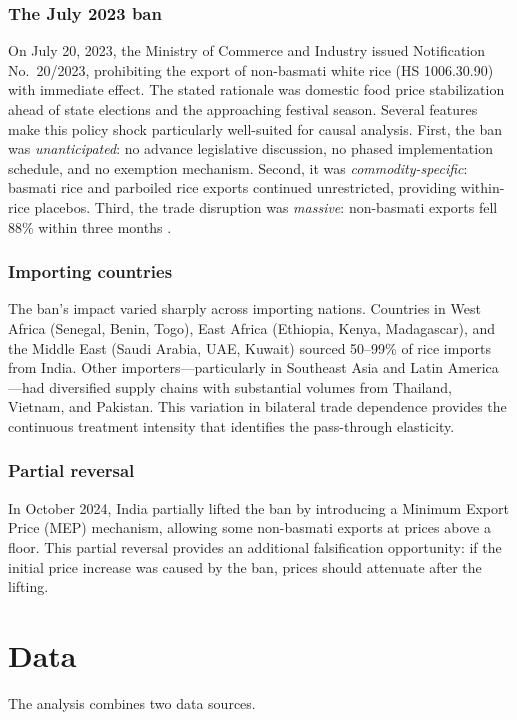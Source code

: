 \documentclass[12pt]{article}
\begin{document}
\subsubsection*{The July 2023 ban} On July 20, 2023, the Ministry of Commerce and Industry issued Notification No.\ 20/2023, prohibiting the export of non-basmati white rice (HS 1006.30.90) with immediate effect. The stated rationale was domestic food price stabilization ahead of state elections and the approaching festival season. Several features make this policy shock particularly well-suited for causal analysis. First, the ban was \textit{unanticipated}: no advance legislative discussion, no phased implementation schedule, and no exemption mechanism. Second, it was \textit{commodity-specific}: basmati rice and parboiled rice exports continued unrestricted, providing within-rice placebos. Third, the trade disruption was \textit{massive}: non-basmati exports fell 88\% within three months \citep{reuters2023india}.

\subsubsection*{Importing countries} The ban's impact varied sharply across importing nations. Countries in West Africa (Senegal, Benin, Togo), East Africa (Ethiopia, Kenya, Madagascar), and the Middle East (Saudi Arabia, UAE, Kuwait) sourced 50--99\% of rice imports from India. Other importers---particularly in Southeast Asia and Latin America---had diversified supply chains with substantial volumes from Thailand, Vietnam, and Pakistan. This variation in bilateral trade dependence provides the continuous treatment intensity that identifies the pass-through elasticity.

\subsubsection*{Partial reversal} In October 2024, India partially lifted the ban by introducing a Minimum Export Price (MEP) mechanism, allowing some non-basmati exports at prices above a floor. This partial reversal provides an additional falsification opportunity: if the initial price increase was caused by the ban, prices should attenuate after the lifting.


\section{Data}

The analysis combines two data sources.
\end{document}
